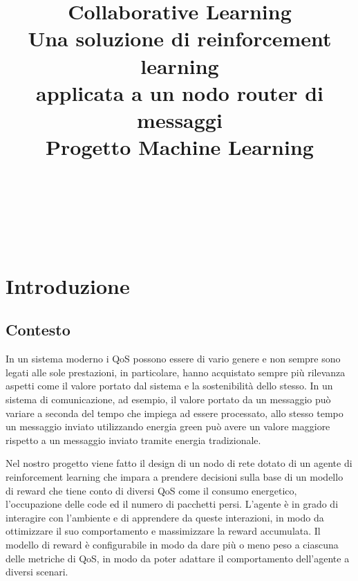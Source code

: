 \documentclass[conference]{IEEEtran}
\begin{document}
\let\subsectionautorefname\sectionautorefname
\let\subsubsectionautorefname\sectionautorefname
\title{Collaborative Learning\\ \large Una soluzione di reinforcement learning\\ applicata a un nodo router di messaggi\\
{\footnotesize Progetto Machine Learning}
}
\author{
 \\
\and
{}
 \\
\and
{}
 \\
}

\maketitle
\thispagestyle{plain}
\pagestyle{plain}

\begin{abstract}
\end{abstract}

\section{Introduzione}
\subsection{Contesto}
In un sistema moderno i QoS possono essere di vario genere e non sempre sono legati alle sole prestazioni, in particolare, hanno acquistato sempre più rilevanza aspetti come il valore portato dal sistema e la sostenibilità dello stesso. In un sistema di comunicazione, ad esempio, il valore portato da un messaggio può variare a seconda del tempo che impiega ad essere processato, allo stesso tempo un messaggio inviato utilizzando energia green può avere un valore maggiore rispetto a un messaggio inviato tramite energia tradizionale.

Nel nostro progetto viene fatto il design di un nodo di rete dotato di un agente di reinforcement learning che impara a prendere decisioni sulla base di un modello di reward che tiene conto di diversi QoS come il consumo energetico, l'occupazione delle code ed il numero di pacchetti persi. L'agente è in grado di interagire con l'ambiente e di apprendere da queste interazioni, in modo da ottimizzare il suo comportamento e massimizzare la reward accumulata. Il modello di reward è configurabile in modo da dare più o meno peso a ciascuna delle metriche di QoS, in modo da poter adattare il comportamento dell'agente a diversi scenari.
\end{document}
